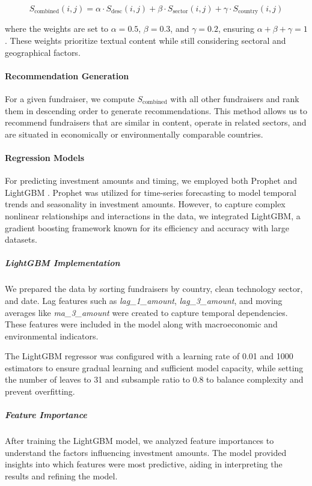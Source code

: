 \documentclass[sigconf]{acmart}
\begin{document}
\[
S_{\text{combined}}(i, j) = \alpha \cdot S_{\text{desc}}(i, j) + \beta \cdot S_{\text{sector}}(i, j) + \gamma \cdot S_{\text{country}}(i, j)
\]

where the weights are set to $\alpha = 0.5$, $\beta = 0.3$, and $\gamma = 0.2$, ensuring $\alpha + \beta + \gamma = 1$. These weights prioritize textual content while still considering sectoral and geographical factors.

\paragraph{Recommendation Generation}

For a given fundraiser, we compute $S_{\text{combined}}$ with all other fundraisers and rank them in descending order to generate recommendations. This method allows us to recommend fundraisers that are similar in content, operate in related sectors, and are situated in economically or environmentally comparable countries.

\paragraph{Regression Models}

For predicting investment amounts and timing, we employed both Prophet \cite{taylor2018forecasting} and LightGBM \cite{ke2017lightgbm}. Prophet was utilized for time-series forecasting to model temporal trends and seasonality in investment amounts. However, to capture complex nonlinear relationships and interactions in the data, we integrated LightGBM, a gradient boosting framework known for its efficiency and accuracy with large datasets.

\subparagraph{LightGBM Implementation}
We prepared the data by sorting fundraisers by country, clean technology sector, and date. Lag features such as \textit{lag\_1\_amount}, \textit{lag\_3\_amount}, and moving averages like \textit{ma\_3\_amount} were created to capture temporal dependencies. These features were included in the model along with macroeconomic and environmental indicators.

The LightGBM regressor was configured with a learning rate of 0.01 and 1000 estimators to ensure gradual learning and sufficient model capacity, while setting the number of leaves to 31 and subsample ratio to 0.8 to balance complexity and prevent overfitting.

\subparagraph{Feature Importance}

After training the LightGBM model, we analyzed feature importances to understand the factors influencing investment amounts. The model provided insights into which features were most predictive, aiding in interpreting the results and refining the model.
\end{document}
